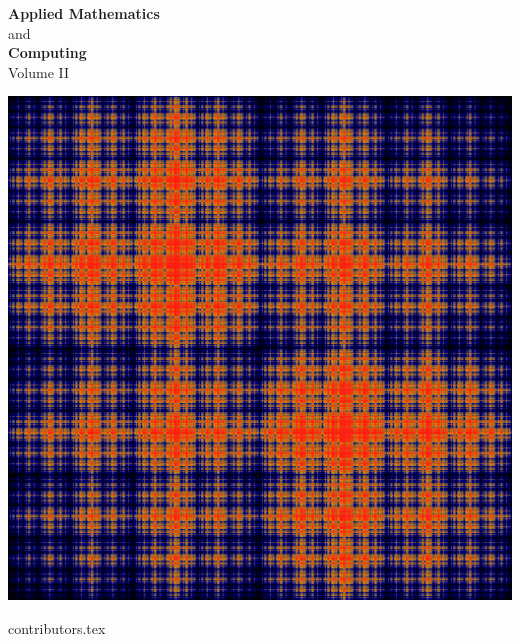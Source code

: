\documentclass[nociteref]{newsiambook}
\begin{document}
\thispagestyle{empty}
\begin{center}
{\huge \bf Applied Mathematics} \\ and \\ {\huge \bf Computing} \\
\vspace{5mm}
{\Large Volume II}
\vspace{20mm}

\includegraphics[scale = .25]{Cover}
\end{center}
\frontmatter

{contributors.tex}

\end{document}
